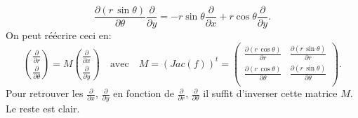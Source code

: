 {{$$\frac{\partial (r\, \sin \theta)}{\partial \theta}\frac{\partial }{\partial y}=
-r\sin  \theta \frac{\partial }{\partial x} + r \cos \theta \frac{\partial }{\partial y}.$$
On peut r\'e\'ecrire ceci en:
$$\binom{\frac{\partial }{\partial r}}{\frac{\partial }{\partial \theta}}=M \binom{\frac{\partial }{\partial x}}{\frac{\partial }{\partial y}}
\quad \text{avec} \quad M= (Jac(f))^t = \left(
                                   \begin{array}{cc}
                                     \frac{\partial (r\, \cos \theta)}{\partial r} & \frac{\partial (r\, \sin \theta)}{\partial r} \\
                                     \frac{\partial (r\, \cos \theta)}{\partial \theta} & \frac{\partial (r\, \sin \theta)}{\partial \theta} \\
                                   \end{array}
                                 \right) .$$
Pour retrouver les $\frac{\partial }{\partial x}$, $\frac{\partial }{\partial y}$ en fonction de $\frac{\partial }{\partial r}$, $\frac{\partial }{\partial \theta}$
il suffit d'inverser cette matrice $M$. Le reste est clair.
}
}
